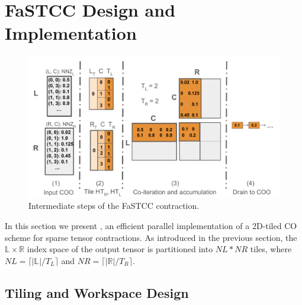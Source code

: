 \section{FaSTCC Design and Implementation\label{sec:details}}

\begin{figure}
\includegraphics[scale=0.35]{fastcc system diag.pdf}
\caption{Intermediate steps of the FaSTCC contraction.}
\label{fig:frostt}
\end{figure}

In this section we present \ourtool, an efficient parallel implementation of a 2D-tiled CO scheme for sparse tensor contractions. As introduced in the previous section, the $\mathbb{L} \times \mathbb{R}$  index space of the output tensor is partitioned into ${\mathit{NL} \ast \mathit{NR}}$ tiles, where $\mathit{NL} = \lceil|\mathbb{L}| / \mathit{T_L} \rceil$ and $\mathit{NR} = \lceil|\mathbb{R}| / \mathit{T_R} \rceil$.

\subsection{Tiling and Workspace Design}

